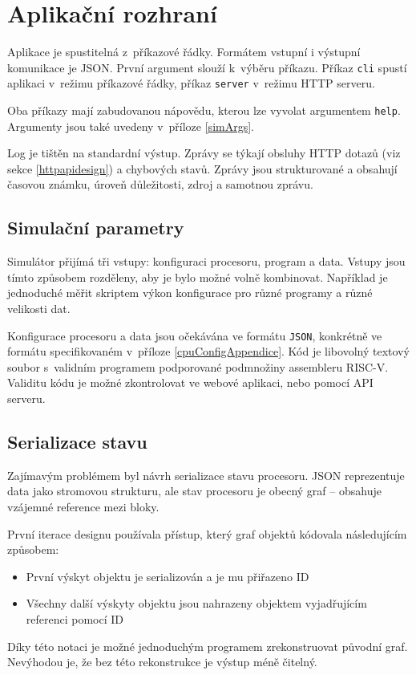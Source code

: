 \section{Aplikační rozhraní}

Aplikace je spustitelná z~příkazové řádky.
Formátem vstupní i výstupní komunikace je JSON.
První argument slouží k~výběru příkazu.
Příkaz \texttt{cli} spustí aplikaci v~režimu příkazové řádky, příkaz \texttt{server} v~režimu HTTP serveru.

Oba příkazy mají zabudovanou nápovědu, kterou lze vyvolat argumentem \texttt{help}.
Argumenty jsou také uvedeny v~příloze \ref{simArgs}.

Log je tištěn na standardní výstup.
Zprávy se týkají obsluhy HTTP dotazů (viz sekce \ref{httpapidesign}) a chybových stavů.
Zprávy jsou strukturované a obsahují časovou známku, úroveň důležitosti, zdroj a samotnou zprávu.

\subsection{Simulační parametry}

Simulátor přijímá tři vstupy: konfiguraci procesoru, program a data.
Vstupy jsou tímto způsobem rozděleny, aby je bylo možné volně kombinovat.
Například je jednoduché měřit skriptem výkon konfigurace pro různé programy a různé velikosti dat.

Konfigurace procesoru a data jsou očekávána ve formátu \texttt{JSON}, konkrétně ve formátu specifikovaném v~příloze \ref{cpuConfigAppendice}.
Kód je libovolný textový soubor s~validním programem podporované podmnožiny assembleru RISC-V.
Validitu kódu je možné zkontrolovat ve webové aplikaci, nebo pomocí API serveru.

\subsection{Serializace stavu}

Zajímavým problémem byl návrh serializace stavu procesoru.
JSON reprezentuje data jako stromovou strukturu, ale stav procesoru je obecný graf -- obsahuje vzájemné reference mezi bloky.

První iterace designu používala přístup, který graf objektů kódovala následujícím způsobem:
\begin{itemize}
    \item První výskyt objektu je serializován a je mu přiřazeno ID
    \item Všechny další výskyty objektu jsou nahrazeny objektem vyjadřujícím referenci pomocí ID
\end{itemize}
Díky této notaci je možné jednoduchým programem zrekonstruovat původní graf.
Nevýhodou je, že bez této rekonstrukce je výstup méně čitelný.

